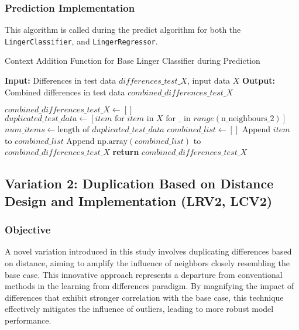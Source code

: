 \documentclass[a4paper, 12pt]{report}
\begin{document}
\subsubsection{Prediction Implementation}
This algorithm is called during the predict algorithm for both the \texttt{LingerClassifier}, and \texttt{LingerRegressor}.
\begin{algorithm}[H]
    \caption{Context Addition Function for Base Linger Classifier during Prediction}
    \textbf{Input:} Differences in test data $differences\_test\_X$, input data $X$
    \textbf{Output:} Combined differences in test data $combined\_differences\_test\_X$
    \label{alg:context_addition_pred}
    \begin{algorithmic}[1]
            \State $combined\_differences\_test\_X \gets []$
            \State $duplicated\_test\_data \gets [item \text{ for } item \text{ in } X \text{ for } \_ \text{ in } range(\text{n\_neighbours\_2})]$
            \State $num\_items \gets \text{length of } duplicated\_test\_data$
                \State $combined\_list \gets []$
                        \State Append $item$ to $combined\_list$
                    \EndFor
                \EndFor
                \State Append $\text{np.array}(combined\_list)$ to $combined\_differences\_test\_X$
            \EndFor
            \State \textbf{return} $combined\_differences\_test\_X$
        \EndFunction
    \end{algorithmic}
\end{algorithm}

\subsection{Variation 2: Duplication Based on Distance Design and Implementation (LRV2, LCV2)}
\label{sec:linger_regr_class_variation2_model}

\subsubsection{Objective}
A novel variation introduced in this study involves duplicating differences based on distance, aiming to amplify the influence of neighbors closely resembling the base case. 
This innovative approach represents a departure from conventional methods in the learning from differences paradigm. 
By magnifying the impact of differences that exhibit stronger correlation with the base case, this technique effectively mitigates the influence of outliers, 
leading to more robust model performance.
\end{document}

